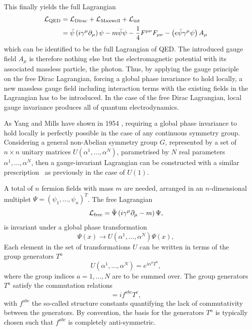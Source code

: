 This finally yields the full Lagrangian
\begin{equation}
\begin{split}
		\mathcal{L}_\mathrm{QED} & = \mathcal{L}_\mathrm{Dirac} + \mathcal{L}_\mathrm{Maxwell} + \mathcal{L}_\mathrm{int} \\
	  				& = \bar{\psi}\left(i\gamma^\mu\partial_\mu\right)\psi - m\bar{\psi}\psi - \frac{1}{4}F^{\mu\nu}F_{\mu\nu} - \left(e\bar{\psi}\gamma^\mu\psi\right)A_\mu
\end{split}
\end{equation}
which can be identified to be the full Lagrangian of QED. The introduced gauge field $A_\mu$ is therefore nothing else but the electromagnetic potential with its associated massless particle, the photon. Thus, by applying the gauge principle on the free Dirac Lagrangian, \ie forcing a global phase invariance to hold locally, a new massless gauge field including interaction terms with the existing fields in the Lagrangian has to be introduced. In the case of the free Dirac Lagrangian, local gauge invariance produces all of quantum electrodynamics.

As Yang and Mills have shown in 1954 \cite{PhysRev.96.191}, requiring a global phase invariance to hold locally is perfectly possible in the case of any continuous symmetry group. Considering a general non-Abelian symmetry group $G$, represented by a set of $n\times n$ unitary matrices $U(\alpha^1,\dots,\alpha^N)$, parametrised by $N$ real parameters $\alpha^1,\dots,\alpha^N$, then a gauge-invariant Lagrangian can be constructed with a similar prescription~\cite{Brock:1354959} as previously in the case of $U(1)$. 

A total of $n$ fermion fields with mass $m$ are needed, arranged in an $n$-dimensional multiplet $\Psi = (\psi_1,\dots,\psi_n)^T$. The free Lagrangian 
\begin{equation}
	\mathcal{L}_\mathrm{free} = \bar{\Psi}\left(i\gamma^\mu\partial_\mu -m\right)\Psi,
	\label{eq:free_lagrangian}
\end{equation}
is invariant under a global phase transformation
\begin{equation}
	\Psi(x) \rightarrow U(\alpha^1,\dots,\alpha^N)\Psi(x),
\end{equation}
Each element in the set of transformations $U$ can be written in terms of the group generators $T^a$
\begin{equation}
	U(\alpha^1,\dots,\alpha^N) = e^{i\alpha^aT^a},
\end{equation}
where the group indices $a = 1,\dots,N$ are to be summed over. The group generators $T^a$ satisfy the commutation relations
\begin{equation}
	[T^a,T^b] = i f^{abc}T^c,
\end{equation}
with $f^{abc}$ the so-called structure constants quantifying the lack of commutativity between the generators. By convention, the basis for the generators $T^a$ is typically chosen such that $f^{abc}$ is completely anti-symmetric.
 
